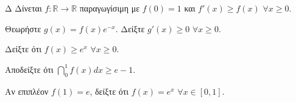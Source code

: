 \begin{thema}{Δ}
Δίνεται $f:\mathbb{R}\to\mathbb{R}$ παραγωγίσιμη με $f(0)=1$ και $f'(x) \geq f(x)$ $\forall x\geq 0$.
\begin{erwthma}
    \item Θεωρήστε $g(x) = f(x)e^{-x}$. Δείξτε $g'(x)\geq 0$ $\forall x\geq 0$. 
    \item Δείξτε ότι $f(x)\geq e^x$ $\forall x\geq 0$. 
    \item Αποδείξτε ότι $\dint_0^1 f(x)dx \geq e-1$. 
    \item Αν επιπλέον $f(1)=e$, δείξτε ότι $f(x)=e^x$ $\forall x\in[0,1]$. 
\end{erwthma}
\end{thema}
